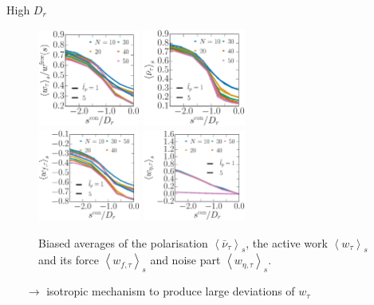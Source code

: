 \documentclass{beamer}
\begin{document}
\begin{frame}{High $D_r$}

\vspace{-5pt}

\begin{figure}
\centering
\includegraphics[width=0.30\textwidth]{sWork_N_Dk6500_Tn1000-Ll1000-con.eps}
\includegraphics[width=0.30\textwidth]{sOrder_N_Dk6500_Tn1000-Ll1000-con.eps}\\
\includegraphics[width=0.30\textwidth]{sWorkForce_N_Dk6500_Tn1000-Ll1000-con.eps}
\includegraphics[width=0.30\textwidth]{sWorkNoise_N_Dk6500_Tn1000-Ll1000-con.eps}
\vspace{-5pt}
\caption{Biased averages of the polarisation $\left<\bar{\nu}_{\tau}\right>_s$, the active work $\left<w_{\tau}\right>_s$ and its force $\left<w_{f, \tau}\right>_s$ and noise part $\left<w_{\eta, \tau}\right>_s$. }
\end{figure}

\begin{itemize}
  \item[$\rightarrow$] isotropic mechanism to produce large deviations of $w_{\tau}$
\end{itemize}

\end{frame}
\end{document}
